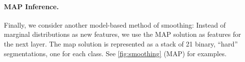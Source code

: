 \documentclass[10pt,twocolumn,letterpaper]{article}
\begin{document}
%
%
%

\paragraph{MAP Inference. }

Finally, we consider another model-based method of smoothing: Instead of marginal distributions as new features, we use the MAP solution
as features for the next layer. The map solution is represented as a stack of 21 binary, ``hard'' segmentations, one for each class. 
See \ref{fig:smoothing} (MAP) for examples.
\end{document}
